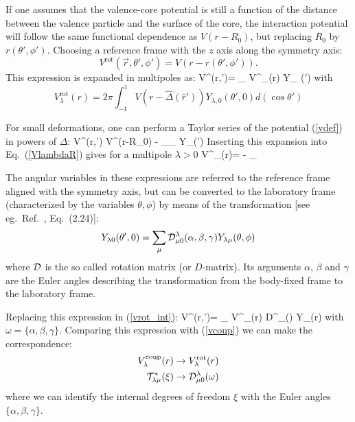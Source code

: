 \documentclass[preprint,12pt]{elsarticle}
\begin{document}
If one assumes that the valence-core potential is still a function of the distance between the valence particle and the surface of the core, the 
interaction potential  will follow the same functional dependence as 
$V(r-R_0)$, but replacing $R_0$ by $r(\theta', \phi')$. Choosing a reference frame with the $z$ axis along the symmetry axis:
\begin{equation}
V^\mathrm{rot}(\vec{r},\theta',\phi') = V(r-r(\theta',\phi')) .
\label{vdef}
\end{equation}
This expression is expanded in multipoles as:
\be
V^(r,')= \sum_{\lambda } V^_{\lambda}(r)  Y_{ }(')
\label{vrot_int}
\ee
with 
\begin{equation}
V^\mathrm{rot}_\lambda(r)= {2 \pi} \int_{-1}^{1} V(r-{\hat \Delta}(\hat{r}'))  Y_{\lambda,0}(\theta',0) d(\cos \theta')
\label{VlambdaR}
\end{equation}


For small deformations, one can perform a Taylor series of the potential (\ref{vdef}) in powers of $\Delta$: 
\be
V^{}(r,') \approx V^{}(r-R_0) -
     \sum_{\lambda }\delta_{\lambda} Y_{}(')
\ee
Inserting this expansion into  Eq.~(\ref{VlambdaR}) gives for a multipole $\lambda >0$
\be
V^_\lambda(r)= - \delta_{\lambda}  
\label{vderiv}
\ee

 

The angular variables in these expressions are referred to the reference frame aligned with the symmetry axis, but can be converted to the laboratory frame 
(characterized by the variables $\theta,\phi$) by means of the transformation [see eg.~Ref.~\cite{BS}, Eq.~(2.24)]: 
$$
Y_{\lambda 0}(\theta',0) = \sum_{\mu} {\cal D}^{\lambda}_{\mu 0}(\alpha,\beta,\gamma) Y_{\lambda \mu }(\theta,\phi) 
$$
where ${\cal D}$ is the so called {\textit rotation matrix} (or $D$-matrix). Its arguments  $\alpha$, $\beta$ and $\gamma$ are 
 the Euler angles describing the transformation from the body-fixed frame to the laboratory frame. 

Replacing this expression  in (\ref{vrot_int}):
%
\be
V^(r,')=
   \sum_{\lambda \mu } V^_{\lambda}(r) 
   {\cal D}^{\lambda}_{}(\omega) 
   Y_{\lambda \mu }(\hat r)
\label{vcoup_rot}
\ee
with $\omega= \{ \alpha,\beta,\gamma\}$. 
%
Comparing this expression with (\ref{vcoup}) we can make the correspondence:
\begin{align}
 V_{\lambda}^\mathrm{coup}(r)  & \rightarrow  V^\mathrm{rot}_{\lambda}(r)   \\
{\cal T}^{*}_{\lambda \mu }(\xi) & \rightarrow  {\cal D}^{\lambda}_{\mu 0}(\omega)
\end{align}
where we can identify the internal degrees of freedom $\xi$ with the Euler angles $\{\alpha, \beta, \gamma \}$.
 
\end{document}
